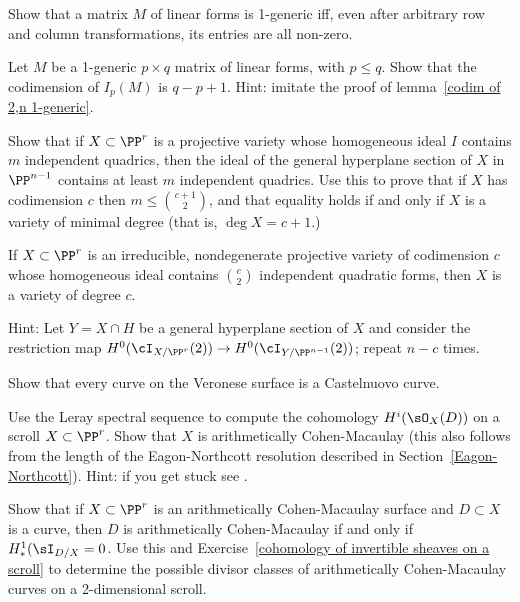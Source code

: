 \begin{exercise}
Show that a matrix $M$ of linear forms is 1-generic iff, even after arbitrary row and column transformations, its entries are all non-zero.
\end{exercise}

\begin{exercise}
Let $M$ be a 1-generic $p\times q$ matrix of linear forms, with $p\leq q$. Show that the codimension of
$I_p(M)$ is $q-p+1$. Hint: imitate the proof of lemma~\ref{codim of 2,n 1-generic}.
\end{exercise}

\begin{exercise}
Show that if $X\subset \PP^r$ is a projective variety whose homogeneous ideal $I$ contains $m$ independent quadrics, then the ideal of the general hyperplane section of $X$ in $\PP^{n-1}$
contains at least $m$ independent quadrics. Use this to prove that if $X$ has codimension $c$ then $m\leq {c+1\choose 2}$, and that equality holds if and only if
$X$ is a variety of minimal degree (that is, $\deg X = c+1$.)
\end{exercise}

\begin{exercise}\label{many quadrics}
 If $X \subset \PP^r$ is an irreducible, nondegenerate projective variety of codimension $c$ whose homogeneous ideal
 contains ${c\choose 2}$ independent quadratic forms, then $X$ is a variety of degree $c$.
 
Hint: Let $Y = X \cap H$ be a general hyperplane section of $X$ and consider the restriction map $H^0(\cI_{X/\PP^r}(2)) \to H^0(\cI_{Y/\PP^{n-1}}(2))$; repeat $n-c$ times.
\end{exercise}

\begin{exercise}\label{Castelnuovo Veronese}
Show that every curve on the Veronese surface is a Castelnuovo curve.
\end{exercise}

\begin{exercise}\label{cohomology of invertible sheaves on a scroll}
Use the Leray spectral sequence to compute the cohomology $H^{i}(\sO_{X}(D))$ on a scroll $X\subset \PP^r$.
Show that $X$ is arithmetically Cohen-Macaulay (this also follows from the length of the Eagon-Northcott resolution
described in Section~\ref{Eagon-Northcott}).
Hint: if you get stuck see \cite[Section V.1]{Hartshorne1977}.
\end{exercise}

\begin{exercise}
 Show that if $X\subset\PP^r$ is an arithmetically Cohen-Macaulay surface
and $D\subset X$ is a curve, then $D$ is arithmetically Cohen-Macaulay if and only if
$H^1_*(\sI_{D/X} = 0$. Use this and Exercise~\ref{cohomology of invertible sheaves on a scroll} to determine the
possible divisor classes of arithmetically Cohen-Macaulay curves on a 2-dimensional scroll.
\end{exercise}

